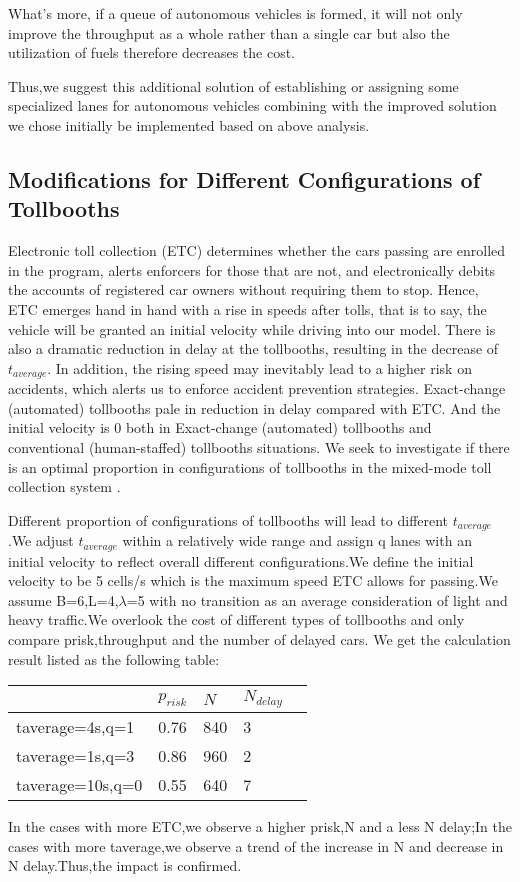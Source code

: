 What's more, if a queue of autonomous vehicles is formed, it will not only improve the throughput as a whole rather than a single car but also the utilization of fuels therefore decreases the cost.

Thus,we suggest this additional solution of establishing or assigning some specialized lanes for autonomous vehicles combining with the improved solution we chose initially be implemented based on above analysis.

\subsection{Modifications for Different Configurations of Tollbooths}
Electronic toll collection (ETC) determines whether the cars passing are enrolled in the program, alerts enforcers for those that are not, and electronically debits the accounts of registered car owners without requiring them to stop. Hence, ETC emerges hand in hand with a rise in speeds after tolls, that is to say, the vehicle will be granted an initial velocity while driving into our model. There is also a dramatic reduction in delay at the tollbooths, resulting in the decrease of $t_{average}$. In addition, the rising speed may inevitably lead to a higher risk on accidents, which alerts us to enforce accident prevention strategies. Exact-change (automated) tollbooths pale in reduction in delay compared with ETC. And the initial velocity is 0 both in Exact-change (automated) tollbooths and conventional (human-staffed) tollbooths situations. We seek to investigate if there is an optimal proportion in configurations of tollbooths in the mixed-mode toll collection system .

Different proportion of configurations of tollbooths will lead to different $t_{average}$.We adjust $t_{average}$ within a relatively wide range and assign q lanes with an initial velocity to reflect overall different configurations.We define the initial velocity to be 5 cells/s which is the maximum speed ETC allows for passing.We assume B=6,L=4,$\lambda$=5 with no transition as an average consideration of light and heavy traffic.We overlook the cost of different types of tollbooths and only compare prisk,throughput and the number of delayed cars.
We get the calculation result listed as the following table:

\begin{table}[h]
\centering
\begin{tabular}{|l|l|l|l|l|}
\hline
 &$p_{risk}$ & $N$ & $N_{delay}$\\
\hline
taverage=4s,q=1&0.76&840&3\\
\hline
taverage=1s,q=3&0.86&960&2\\
\hline
taverage=10s,q=0&0.55&640&7\\
\hline
\end{tabular}
\end{table}
In the cases with more ETC,we observe a higher prisk,N and a less N delay;In the cases with more taverage,we observe a trend of the increase in N and decrease in N delay.Thus,the impact is confirmed.
		




